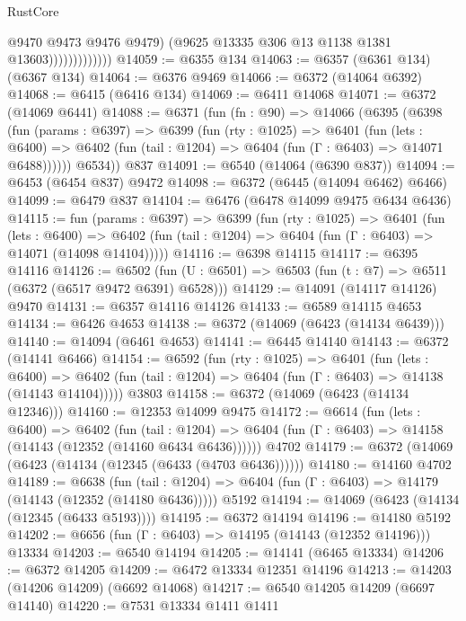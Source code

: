 \begin{lexlean}{RustCore}
\begin{coremodule}
                              @9470
                              @9473
                              @9476
                              @9479)
                            (@9625 @13335 @306 @13 @1138 @1381 @13603)))))))))))))
@14059 := @6355 @134
@14063 := @6357 (@6361 @134) (@6367 @134)
@14064 := @6376 @9469
@14066 := @6372 (@14064 @6392)
@14068 := @6415 (@6416 @134)
@14069 := @6411 @14068
@14071 := @6372 (@14069 @6441)
@14088 := @6371
    (fun (fn : @90) =>
    @14066
      (@6395
        (@6398
          (fun (params : @6397) =>
          @6399
            (fun (rty : @1025) =>
            @6401
              (fun (lets : @6400) =>
              @6402 (fun (tail : @1204) => @6404 (fun (Γ : @6403) => @14071 @6488))))))
        @6534))
    @837
@14091 := @6540 (@14064 (@6390 @837))
@14094 := @6453 (@6454 @837) @9472
@14098 := @6372 (@6445 (@14094 @6462) @6466)
@14099 := @6479 @837
@14104 := @6476 (@6478 @14099 @9475 @6434 @6436)
@14115 := fun (params : @6397) =>
  @6399
    (fun (rty : @1025) =>
    @6401
      (fun (lets : @6400) =>
      @6402 (fun (tail : @1204) => @6404 (fun (Γ : @6403) => @14071 (@14098 @14104)))))
@14116 := @6398 @14115
@14117 := @6395 @14116
@14126 := @6502 (fun (U : @6501) => @6503 (fun (t : @7) => @6511 (@6372 (@6517 @9472 @6391) @6528)))
@14129 := @14091 (@14117 @14126) @9470
@14131 := @6357 @14116 @14126
@14133 := @6589 @14115 @4653
@14134 := @6426 @4653
@14138 := @6372 (@14069 (@6423 (@14134 @6439)))
@14140 := @14094 (@6461 @4653)
@14141 := @6445 @14140
@14143 := @6372 (@14141 @6466)
@14154 := @6592
    (fun (rty : @1025) =>
    @6401
      (fun (lets : @6400) =>
      @6402 (fun (tail : @1204) => @6404 (fun (Γ : @6403) => @14138 (@14143 @14104)))))
    @3803
@14158 := @6372 (@14069 (@6423 (@14134 @12346)))
@14160 := @12353 @14099 @9475
@14172 := @6614
    (fun (lets : @6400) =>
    @6402
      (fun (tail : @1204) =>
      @6404 (fun (Γ : @6403) => @14158 (@14143 (@12352 (@14160 @6434 @6436))))))
    @4702
@14179 := @6372 (@14069 (@6423 (@14134 (@12345 (@6433 (@4703 @6436))))))
@14180 := @14160 @4702
@14189 := @6638
    (fun (tail : @1204) => @6404 (fun (Γ : @6403) => @14179 (@14143 (@12352 (@14180 @6436)))))
    @5192
@14194 := @14069 (@6423 (@14134 (@12345 (@6433 @5193))))
@14195 := @6372 @14194
@14196 := @14180 @5192
@14202 := @6656 (fun (Γ : @6403) => @14195 (@14143 (@12352 @14196))) @13334
@14203 := @6540 @14194
@14205 := @14141 (@6465 @13334)
@14206 := @6372 @14205
@14209 := @6472 @13334 @12351 @14196
@14213 := @14203 (@14206 @14209) (@6692 @14068)
@14217 := @6540 @14205 @14209 (@6697 @14140)
@14220 := @7531 @13334 @1411 @1411

\end{coremodule}
\end{lexlean}
